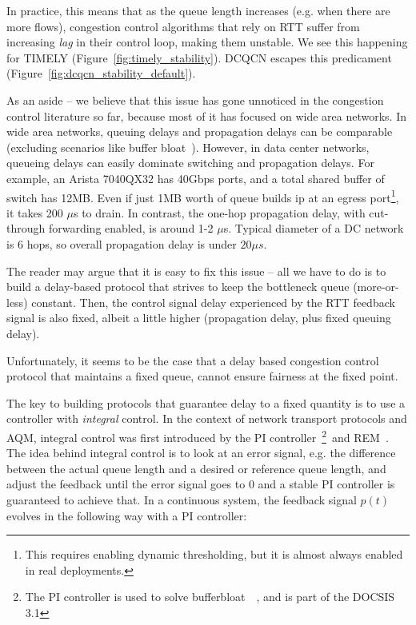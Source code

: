 In practice, this means that as the queue length increases (e.g. when there are
more flows), congestion control algorithms that rely on RTT suffer from
increasing {\em lag} in their control loop, making them unstable. We see this
happening for TIMELY (Figure~\ref{fig:timely_stability}). DCQCN escapes this
predicament (Figure~\ref{fig:dcqcn_stability_default}).

As an aside -- we believe that this issue has gone unnoticed in the congestion
control literature so far, because most of it has focused on wide area networks.
In wide area networks, queuing delays and propagation delays can be comparable
(excluding scenarios like buffer bloat~\cite{bufferbloat}). However, in data
center networks, queueing delays can easily dominate switching and
propagation delays.  For example, an Arista 7040QX32 has 40Gbps ports, and a
total shared buffer of switch has 12MB. Even if just 1MB worth of queue builds
ip at an egress port\footnote{This requires enabling dynamic thresholding, but it is
almost always enabled in real deployments.}, it takes 200 $\mu$s to drain. In contrast, the one-hop
propagation delay, with cut-through forwarding enabled, is around
1-2 $\mu$s.  Typical diameter of a DC network is 6 hops, so overall propagation
delay is under $20\mu s$.

The reader may argue that it is easy to fix this issue  -- all we have to do is
to build a delay-based protocol that strives to keep the  bottleneck queue
(more-or-less) constant. Then, the control signal delay experienced by the RTT
feedback signal is also fixed, albeit a little higher (propagation delay, plus
fixed queuing delay). 

Unfortunately, it seems to be the case that a delay based congestion control
protocol that maintains a fixed queue, cannot ensure fairness at the fixed point.

The key to building protocols that guarantee delay to a fixed quantity is to use
a controller with \emph{integral} control. In the context of network transport
protocols and AQM, integral control was first introduced by the PI
controller~\cite{hollot2001designing}\footnote{ The PI controller is 
used to solve
bufferbloat~\cite{conf/hpsr/PanNPPSBV13,bufferbloat-pi}~, and is part of
the DOCSIS 3.1}~and REM~\cite{REM}.  The idea behind integral control
is to look at an error signal, e.g. the difference between the actual queue
length and a desired or reference queue length, and adjust the feedback until
the error signal goes to 0 and a stable PI controller is guaranteed to achieve
that. In a continuous system, the feedback signal $p(t)$ evolves in the
following way with a PI controller:

